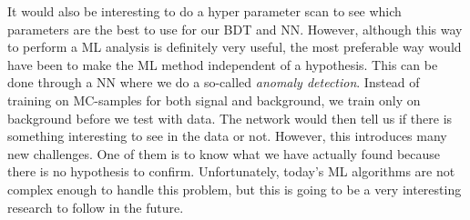 It would also be interesting to do a hyper parameter scan to see which parameters are the best to use for our BDT and NN. However, although this way to perform a ML analysis is definitely very useful, the most preferable way would have been to make the ML method independent of a hypothesis. This can be done through a NN where we do a so-called \textit{anomaly detection}. Instead of training on MC-samples for both signal and background, we train only on background before we test with data. The network would then tell us if there is something interesting to see in the data or not. However, this introduces many new challenges. One of them is to know what we have actually found because there is no hypothesis to confirm. Unfortunately, today's ML algorithms are not complex enough to handle this problem, but this is going to be a very interesting research to follow in the future.







\begin{comment}


Konklusjon:
- ML mer sensitiv
- Si kort om hva som er gjort


Outlook:
- No precuts
- Hyperparameter søk
- Anomaly detection
- Andre/flere features
- 


\end{comment}
